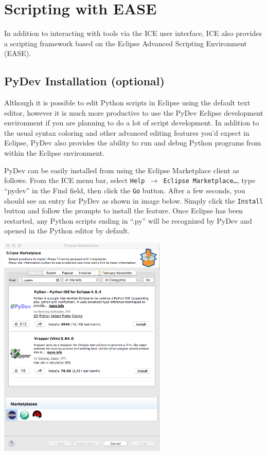 \section{Scripting with EASE}
In addition to interacting with tools via the ICE user interface, ICE also
provides a scripting framework based on the Eclipse Advanced Scripting
Environment (EASE). 

\subsection{PyDev Installation (optional)} 

Although it is possible to edit Python scripts in Eclipse using the default text editor,
however it is much more productive to use the PyDev Eclipse development
environment if you are planning to do a lot of script development. In addition to the 
usual syntax coloring and other advanced editing features you'd expect in Eclipse, 
PyDev also provides the ability to run and debug Python programs from within the Eclipse environment.

PyDev can be easily installed from using the Eclipse Marketplace client as
follows. From the ICE menu bar, select \texttt{Help $\rightarrow$ Eclipse
Marketplace\ldots}, type ``pydev'' in the Find field, then click the \texttt{Go}
button.
After a few seconds, you should see an entry for PyDev as shown in image below.
Simply click the \texttt{Install} button and follow the prompts to install the feature. Once
Eclipse has been restarted, any Python scripts ending in ``.py'' will be recognized by
PyDev and opened in the Python editor by default.

\begin{center} \includegraphics[width=8cm]{images/pydev-marketplace}
\end{center}

